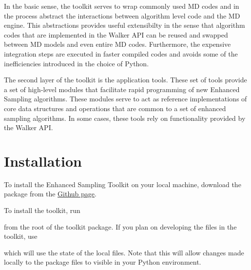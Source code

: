 \documentclass[letterpaper,10pt,english]{sphinxmanual}
\begin{document}
In the basic sense, the toolkit serves to wrap commonly used MD codes and in the process abstract the interactions between algorithm level code and the MD engine. This abstractions provides useful extensibilty in the sense that algorithm codes that are implemented in the Walker API can be reused and swapped between MD models and even entire MD codes. Furthermore, the expensive integration steps are executed in faster compiled codes and avoids some of the inefficiencies introduced in the choice of Python.

The second layer of the toolkit is the application tools. These set of tools provide a set of high-level modules that facilitate rapid programming of new Enhanced Sampling algorithms. These modules serve to act as reference implementations of core data structures and operations that are common to a set of enhanced sampling algorithms. In some cases, these tools rely on functionality provided by the Walker API.


\chapter{Installation}
\label{\detokenize{installation.doc:installation}}\label{\detokenize{installation.doc::doc}}
To install the Enhanced Sampling Toolkit on your local machine, download the package from the \href{https://github.com/jtempkin/enhanced\_sampling\_toolkit}{Github page}.

To install the toolkit, run

\begin{sphinxVerbatim}[commandchars=\\\{\}]
  
\end{sphinxVerbatim}

from the root of the toolkit package. If you plan on developing the files in the toolkit, use

\begin{sphinxVerbatim}[commandchars=\\\{\}]
  
\end{sphinxVerbatim}

which will use the state of the local files. Note that this will allow changes made locally to the package files to visible in your Python environment.



\renewcommand{\indexname}{Index}
\printindex
\end{document}
